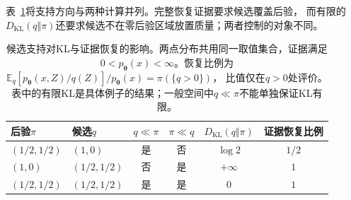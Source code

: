 表~\ref{tab:information-candidate-support}将支持方向与两种计算并列。完整恢复证据要求候选覆盖后验，
而有限的\(D_{\mathrm{KL}}(q\Vert\pi)\)还要求候选不在零后验区域放置质量；两者控制的对象不同。
\begin{table}[htbp]
  \centering\small
  \begin{tabularx}{\linewidth}{XXcccc}
    \toprule
    后验\(\pi\) & 候选\(q\) & \(q\ll\pi\) & \(\pi\ll q\) & \(D_{\mathrm{KL}}(q\Vert\pi)\) & 证据恢复比例\\
    \midrule
    \((1/2,1/2)\) & \((1,0)\) & 是 & 否 & \(\log2\) & \(1/2\)\\
    \((1,0)\) & \((1/2,1/2)\) & 否 & 是 & \(+\infty\) & \(1\)\\
    \((1/2,1/2)\) & \((1/2,1/2)\) & 是 & 是 & \(0\) & \(1\)\\
    \bottomrule
  \end{tabularx}
  \caption{候选支持对KL与证据恢复的影响。两点分布共用同一取值集合，证据满足
  \(0<p_{\bm\theta}(x)<\infty\)。恢复比例为\(\mathbb E_q[p_{\bm\theta}(x,Z)/q(Z)]/p_{\bm\theta}(x)=\pi(\{q>0\})\)，
  比值仅在\(q>0\)处评价。表中的有限KL是具体例子的结果；一般空间中\(q\ll\pi\)不能单独保证KL有限。}
  \label{tab:information-candidate-support}
\end{table}
